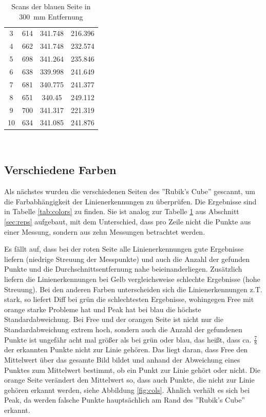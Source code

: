 \documentclass[ngerman,a4paper,parskip=half]{scrartcl}
\begin{document}
\begin{table}[H]
\begin{tabular}{c|c|c|c}
		3 & 614 & 341.748 & 216.396 \\
		4 & 662 & 341.748 & 232.574 \\
		5 & 698 & 341.264 & 235.846 \\
		6 & 638 & 339.998 & 241.649 \\
		7 & 681 & 340.775 & 241.377 \\
		8 & 651 & 340.45 & 249.112 \\
		9 & 700 & 341.317 & 221.319 \\
		10 & 634 & 341.085 & 241.876 \\
		\end{tabular} \
	\caption{Scans der blauen Seite in 300~mm Entfernung}
	\label{tab:reps}
\end{table}

\subsection{Verschiedene Farben}
\label{sec:cols}

Als nächstes wurden die verschiedenen Seiten des ''Rubik's Cube'' gescannt, um die Farbabhängigkeit der Linienerkennungen zu überprüfen. Die Ergebnisse sind in Tabelle \ref{tab:colors} zu finden. Sie ist analog zur Tabelle \ref{tab:reps} aus Abschnitt \ref{sec:reps} aufgebaut, mit dem Unterschied, dass pro Zeile nicht die Punkte aus einer Messung, sondern aus zehn Messungen betrachtet werden.

Es fällt auf, dass bei der roten Seite alle Linienerkennungen gute Ergebnisse liefern (niedrige Streuung der Messpunkte) und auch die Anzahl der gefunden Punkte und die Durchschnittsentfernung nahe beieinanderliegen. Zusätzlich liefern die Linienerkennungen bei Gelb vergleichsweise schlechte Ergebnisse (hohe Streuung). Bei den anderen Farben unterscheiden sich die Linienerkennungen z.T. stark, so liefert Diff bei grün die schlechtesten Ergebnisse, wohingegen Free mit orange starke Probleme hat und Peak hat bei blau die höchste Standardabweichung. Bei Free und der orangen Seite ist nicht nur die Standardabweichung extrem hoch, sondern auch die Anzahl der gefundenen Punkte ist ungefähr acht mal größer als bei grün oder blau, das heißt, dass ca. $\frac{7}{8}$ der erkannten Punkte nicht zur Linie gehören. Das liegt daran, dass Free den Mittelwert über das gesamte Bild bildet und anhand der Abweichung eines Punktes zum Mittelwert bestimmt, ob ein Punkt zur Linie gehört oder nicht. Die orange Seite verändert den Mittelwert so, dass auch Punkte, die nicht zur Linie gehören erkannt werden, siehe Abbildung \ref{fig:cols}. Ähnlich verhält es sich bei Peak, da werden falsche Punkte hauptsächlich am Rand des ''Rubik's Cube'' erkannt.
\end{document}
